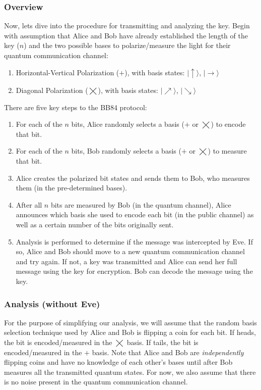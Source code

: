 \documentclass[11pt]{article} %
\begin{document}
\subsubsection{Overview}
Now, lets dive into the procedure for transmitting and analyzing the key. Begin with assumption that Alice and Bob have already established the length of the key ($n$) and the two possible bases to polarize/measure the light for their quantum communication channel:
\begin{enumerate}
    \item Horizontal-Vertical Polarization ($\pmb{+}$), with basis states: $|\uparrow\rangle$, $|\rightarrow\rangle$
    \item Diagonal Polarization ($\bigtimes$), with basis states: $|\nearrow\rangle$, $|\searrow\rangle$
\end{enumerate}
There are five key steps to the BB84 protocol:
\begin{enumerate}
    \item For each of the $n$ bits, Alice randomly selects a basis ($\pmb{+}$ or $\bigtimes$) to encode that bit.
    \item For each of the $n$ bits, Bob randomly selects a basis ($\pmb{+}$ or $\bigtimes$) to measure that bit.
    \item Alice creates the polarized bit states and sends them to Bob, who measures them (in the pre-determined bases). 
    \item After all $n$ bits are measured by Bob (in the quantum channel), Alice announces which basis she used to encode each bit (in the public channel) as well as a certain number of the bits originally sent.
    \item Analysis is performed to determine if the message was intercepted by Eve. If so, Alice and Bob should move to a new quantum communication channel and try again. If not, a key was transmitted and Alice can send her full message using the key for encryption. Bob can decode the message using the key.
\end{enumerate}

\subsubsection{Analysis (without Eve)}
For the purpose of simplifying our analysis, we will assume that the random basis selection technique used by Alice and Bob is flipping a coin for each bit. If heads, the bit is encoded/measured in the  $\bigtimes$ basis. If tails, the bit is encoded/measured in the  $\pmb{+}$ basis. Note that Alice and Bob are \textit{independently} flipping coins and have no knowledge of each other's bases until after Bob measures all the transmitted quantum states. For now, we also assume that there is no noise present in the quantum communication channel. 
\end{document}
